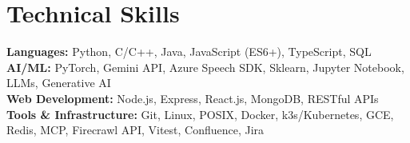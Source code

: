 \section{Technical Skills}
 \begin{itemize}[leftmargin=0.15in, label={}]
    \small{
        \item{
            \textbf{Languages: }{Python, C/C++, Java, JavaScript (ES6+), TypeScript, SQL} \\
            \textbf{AI/ML: }{PyTorch, Gemini API, Azure Speech SDK, Sklearn, Jupyter Notebook, LLMs, Generative AI} \\
            \textbf{Web Development: }{Node.js, Express, React.js, MongoDB, RESTful APIs} \\
            \textbf{Tools \& Infrastructure: }{Git, Linux, POSIX, Docker, k3s/Kubernetes, GCE, Redis, MCP, Firecrawl API, Vitest, Confluence, Jira}
        }
    }
 \end{itemize}
